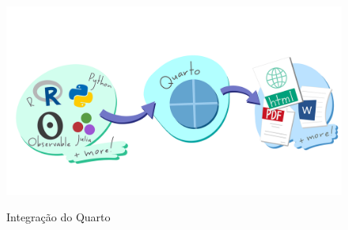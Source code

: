 \documentclass[
  a4paper,
]{article}
\begin{document}
\begin{figure}

\href{https://datascience.arizona.edu/events/reproducible-reporting-quarto}{\includegraphics{img/quarto-illustration.png}}

\caption{\label{fig-quarto-illustration}Integração do Quarto}

\end{figure}%
\end{document}
